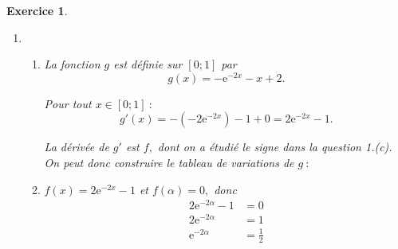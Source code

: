 \documentclass[10pt]{article}
\newtheorem{exo}{Exercice}
\begin{document}
\begin{exo}
\begin{enumerate}
\begin{enumerate}
\begin{multicols}{2}
\begin{itemize}
  \item[\textbullet] $f(\alpha)=0~;$
  \item[\textbullet] $f$ est strictement positive dans la zone rouge~;
    \item[\textbullet] $f$ est strictement négative dans la zone bleue.
    \end{itemize}
    
    \medskip

 On a donc le tableau de signe~:
  
  \medskip
  
  \begin{center}
\end{center}


\end{multicols}
  
  

  
 

  
 \end{enumerate}
 \item \begin{enumerate}
 \item La fonction $g$ est définie sur $\left[0;1\right]$ par \[g(x)=-\text{e}^{-2x}-x+2.\]
 
 \medskip
 
 Pour tout $x\in\left[0;1\right]~:$
 \[g'(x)=-\left(-2\text{e}^{-2x}\right)-1+0=2\text{e}^{-2x}-1.\]
 
 La dérivée de $g'$ est $f,$ dont on a étudié le signe dans la question  1.(c). On peut donc construire le tableau de variations de $g~:$
 
 \begin{center}
\end{center}
 
 
 \item $f(x)=2\text{e}^{-2x}-1$ et $f(\alpha)=0,$ donc
 \begin{align*}
 2\text{e}^{-2\alpha}-1&=0\\
 2\text{e}^{-2\alpha}&=1\\
 \text{e}^{-2\alpha}&=\frac{1}{2}
 \end{align*}
 

\end{enumerate}
\end{enumerate}
\end{exo}
\end{document}
